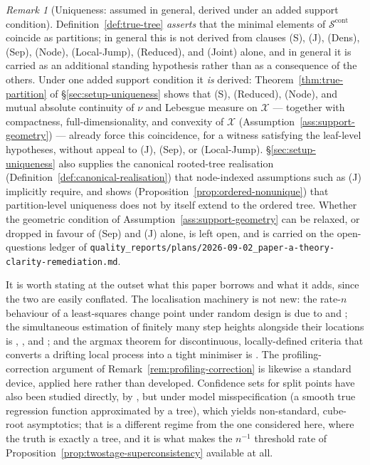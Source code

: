 \documentclass[11pt]{article}
\theoremstyle{plain}
\theoremstyle{definition}
\theoremstyle{remark}
\newtheorem{remark}[theorem]{Remark}
\newcommand{\cX}{\mathcal{X}}
\newcommand{\cS}{\mathcal{S}}
\begin{document}
\begin{remark}[Uniqueness: assumed in general, derived under an added support
condition]\label{rem:true-tree-open}
Definition~\ref{def:true-tree} \emph{asserts} that the minimal elements of
$\cS^{\mathrm{cont}}$ coincide as partitions; in general this is not derived
from clauses (S), (J), (Dens), (Sep), (Node), (Local-Jump), (Reduced), and
(Joint) alone, and in general it is carried as an additional standing
hypothesis rather than as a consequence of the others. Under one added
support condition it \emph{is} derived:
Theorem~\ref{thm:true-partition} of \S\ref{sec:setup-uniqueness} shows that
(S), (Reduced), (Node), and mutual absolute continuity of \(\nu\) and
Lebesgue measure on \(\cX\) --- together with compactness,
full-dimensionality, and convexity of $\cX$ (Assumption~\ref{ass:support-geometry}) --- already force
this coincidence, for a witness satisfying the leaf-level hypotheses, without
appeal to (J), (Sep), or (Local-Jump). \S\ref{sec:setup-uniqueness} also
supplies the canonical rooted-tree realisation
(Definition~\ref{def:canonical-realisation}) that node-indexed assumptions
such as (J) implicitly require, and shows (Proposition~\ref{prop:ordered-nonunique})
that partition-level uniqueness does not by itself extend to the ordered
tree. Whether the geometric condition of
Assumption~\ref{ass:support-geometry} can be relaxed, or dropped in favour of
(Sep) and (J) alone, is left open, and is carried on the open-questions
ledger of
\texttt{quality\_reports/plans/2026-09-02\_paper-a-theory-clarity-remediation.md}.
\end{remark}

It is worth stating at the outset what this paper borrows and what it adds,
since the two are easily conflated. The localisation machinery is not new: the
rate-$n$ behaviour of a least-squares change point under random design is due
to \citet{chan1993} and \citet{seijosen2011}; the simultaneous estimation of
finitely many step heights alongside their locations is \citet{baiperron1998},
\citet{yaoau1989}, and \citet{boysen2009}; and the argmax theorem for
discontinuous, locally-defined criteria that converts a drifting local process
into a tight minimiser is \citet{seootsu2018}. The profiling-correction
argument of Remark~\ref{rem:profiling-correction} is likewise a standard
device, applied here rather than developed. Confidence sets for split points
have also been studied directly, by \citet{banerjee2007}, but under model
misspecification (a smooth true regression function approximated by a tree),
which yields non-standard, cube-root asymptotics; that is a different regime
from the one considered here, where the truth is exactly a tree, and it is
what makes the $n^{-1}$ threshold rate of
Proposition~\ref{prop:twostage-superconsistency} available at all.
\end{document}
